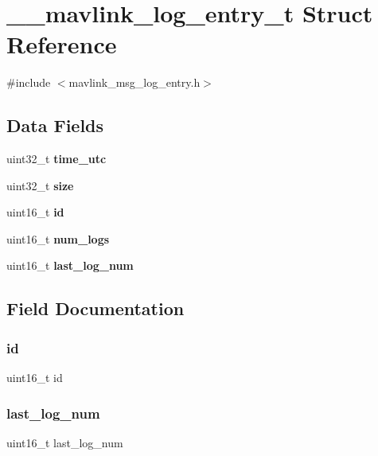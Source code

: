 \section{\+\_\+\+\_\+mavlink\+\_\+log\+\_\+entry\+\_\+t Struct Reference}
\label{struct____mavlink__log__entry__t}


{\ttfamily \#include $<$mavlink\+\_\+msg\+\_\+log\+\_\+entry.\+h$>$}

\subsection*{Data Fields}
\begin{DoxyCompactItemize}
\item 
uint32\+\_\+t \textbf{ time\+\_\+utc}
\item 
uint32\+\_\+t \textbf{ size}
\item 
uint16\+\_\+t \textbf{ id}
\item 
uint16\+\_\+t \textbf{ num\+\_\+logs}
\item 
uint16\+\_\+t \textbf{ last\+\_\+log\+\_\+num}
\end{DoxyCompactItemize}


\subsection{Field Documentation}
\mbox{\label{struct____mavlink__log__entry__t_a4fc3a0c58dfbd1e68224521185cb9384}} 
\subsubsection{id}
{\footnotesize\ttfamily uint16\+\_\+t id}

\mbox{\label{struct____mavlink__log__entry__t_abc9c14722a1a8db581f148848c6af266}} 
\subsubsection{last\+\_\+log\+\_\+num}
{\footnotesize\ttfamily uint16\+\_\+t last\+\_\+log\+\_\+num}


